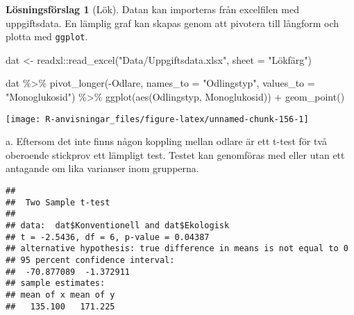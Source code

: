 \documentclass[
]{book}
\newenvironment{Shaded}{\begin{snugshade}}{\end{snugshade}}
\newcommand{\AttributeTok}[1]{\textcolor[rgb]{0.77,0.63,0.00}{#1}}
\newcommand{\FunctionTok}[1]{\textcolor[rgb]{0.00,0.00,0.00}{#1}}
\newcommand{\NormalTok}[1]{#1}
\newcommand{\OtherTok}[1]{\textcolor[rgb]{0.56,0.35,0.01}{#1}}
\newcommand{\SpecialCharTok}[1]{\textcolor[rgb]{0.00,0.00,0.00}{#1}}
\newcommand{\StringTok}[1]{\textcolor[rgb]{0.31,0.60,0.02}{#1}}
\theoremstyle{definition}
\theoremstyle{definition}
\theoremstyle{definition}
\theoremstyle{definition}
\newtheorem{hypothesis}{Lösningsförslag}[chapter]
\theoremstyle{remark}
\begin{document}
\begin{hypothesis}[Lök]
Datan kan importeras från excelfilen med uppgiftsdata. En lämplig graf kan skapas genom att pivotera till långform och plotta med \texttt{ggplot}.

\begin{Shaded}
\begin{Highlighting}[]
\NormalTok{dat }\OtherTok{\textless{}{-}}\NormalTok{ readxl}\SpecialCharTok{::}\FunctionTok{read\_excel}\NormalTok{(}\StringTok{"Data/Uppgiftsdata.xlsx"}\NormalTok{, }\AttributeTok{sheet =} \StringTok{"Lökfärg"}\NormalTok{)}

\NormalTok{dat }\SpecialCharTok{\%\textgreater{}\%} 
  \FunctionTok{pivot\_longer}\NormalTok{(}\SpecialCharTok{{-}}\NormalTok{Odlare, }\AttributeTok{names\_to =} \StringTok{"Odlingstyp"}\NormalTok{, }
               \AttributeTok{values\_to =} \StringTok{"Monoglukosid"}\NormalTok{) }\SpecialCharTok{\%\textgreater{}\%} 
  \FunctionTok{ggplot}\NormalTok{(}\FunctionTok{aes}\NormalTok{(Odlingstyp, Monoglukosid)) }\SpecialCharTok{+}
  \FunctionTok{geom\_point}\NormalTok{()}
\end{Highlighting}
\end{Shaded}

\begin{center}\texttt{[image: R-anvisningar\_files/figure-latex/unnamed-chunk-156-1]} \end{center}

a. Eftersom det inte finns någon koppling mellan odlare är ett t-test för två oberoende stickprov ett lämpligt test. Testet kan genomföras med eller utan ett antagande om lika varianser inom grupperna.

\begin{Shaded}
\end{Shaded}

\begin{verbatim}
## 
##  Two Sample t-test
## 
## data:  dat$Konventionell and dat$Ekologisk
## t = -2.5436, df = 6, p-value = 0.04387
## alternative hypothesis: true difference in means is not equal to 0
## 95 percent confidence interval:
##  -70.877089  -1.372911
## sample estimates:
## mean of x mean of y 
##   135.100   171.225
\end{verbatim}


\end{hypothesis}
\end{document}
